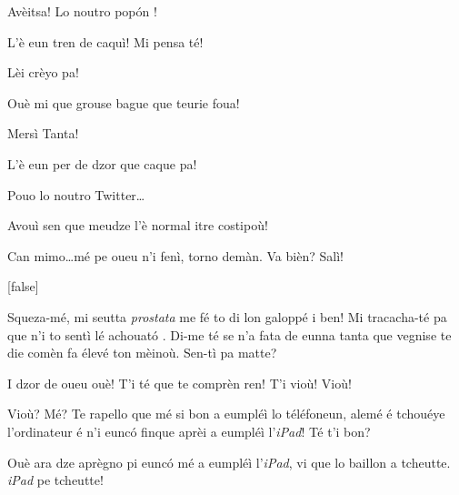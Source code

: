 \begin{drama}

\Alicespeaks{} Avèitsa! Lo noutro pop\'on !

\Tanteunspeaks L'è eun tren de caquì! Mi pensa té!


\Alicespeaks Lèi crèyo pa!

\Tanteunspeaks Ouè mi que grouse bague que teurie foua!

\Alicespeaks{} Mersì Tanta!

\Tantaspeaks{} L'è eun per de dzor que caque pa!

\Alicespeaks Pouo lo noutro Twitter\ldots

\Tanteunspeaks{}Avouì sen que meudze l'è normal itre costipoù!

\Tantaspeaks Can mimo\ldots mé pe oueu n'i fenì, torno demàn. Va bièn? Salì!

[false]%






\Vioupspeaks Squeza-m\'e, mi seutta \textit{prostata} me fé to di lon galoppé i ben! Mi tracacha-t\'e pa que n'i to sentì lé achouat\'o .  Di-me té se n'a fata de eunna tanta que vegnise te die comèn fa élevé ton mèinoù. Sen-tì pa matte?

\Vioujspeaks I dzor de oueu ouè! T'i té que te comprèn ren! T'i  vioù! Vioù!

\Vioupspeaks{} Vioù? Mé? Te rapello que mé si bon a eumpl\'eì lo téléfoneun, alemé é tchouéye l'ordinateur é n'i eunc\'o finque aprèi a eumpl\'eì l'\textit{iPad}! Té t'i bon?

\Vioujspeaks Ouè ara dze aprègno pi eunc\'o mé a eumpl\'eì l'\textit{iPad}, vi que lo baillon a tcheutte. \textit{iPad} pe tcheutte!


\end{drama}
